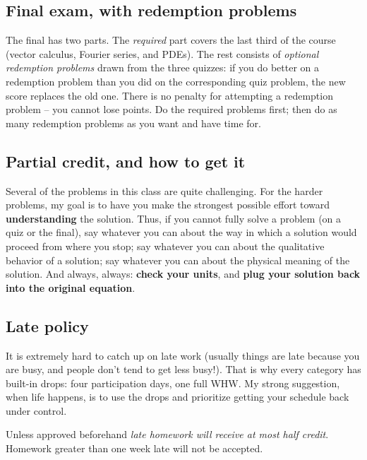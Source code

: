 \documentclass{tufte-handout}
\begin{document}
\subsection{Final exam, with redemption problems}

The final has two parts. The \emph{required} part covers the last
third of the course (vector calculus, Fourier series, and PDEs). The
rest consists of \emph{optional redemption problems} drawn from the
three quizzes: if you do better on a redemption problem than you did
on the corresponding quiz problem, the new score replaces the old
one. There is no penalty for attempting a redemption problem -- you
cannot lose points. Do the required problems first; then do as many
redemption problems as you want and have time for.

\subsection{Partial credit, and how to get it}

Several of the problems in this class are quite challenging. For the
harder problems, my goal is to have you make the strongest possible
effort toward \textbf{understanding} the solution. Thus, if you cannot
fully solve a problem (on a quiz or the final), say whatever you can
about the way in which a solution would proceed from where you stop;
say whatever you can about the qualitative behavior of a solution; say
whatever you can about the physical meaning of the solution. And
always, always: \textbf{check your units}, and \textbf{plug your
solution back into the original equation}.

\subsection{Late policy}

It is extremely hard to catch up on late work (usually things are late
because you are busy, and people don't tend to get less busy!). That
is why every category has built-in drops: four participation days, one
full WHW. My strong suggestion, when life happens, is to use the drops
and prioritize getting your schedule back under control.

\medskip
Unless approved beforehand \emph{late homework will receive at most half
  credit}. Homework greater than one week late will not be accepted.
\end{document}
